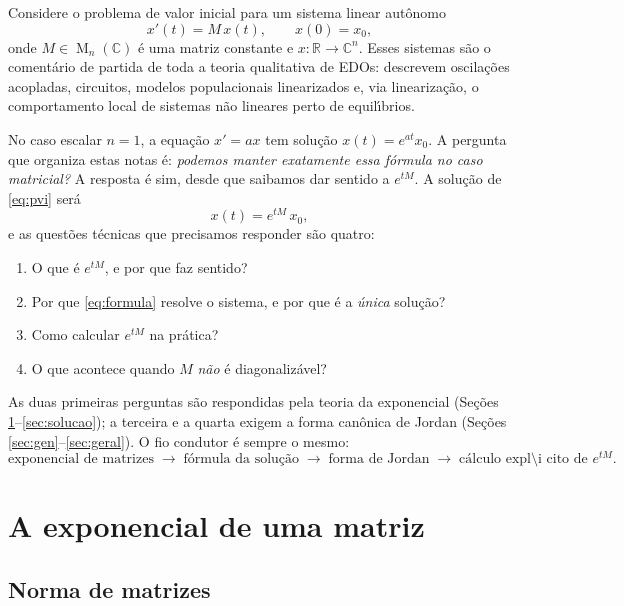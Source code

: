 \documentclass[11pt,a4paper]{amsart}
\newcommand{\R}{\mathbb{R}}
\newcommand{\C}{\mathbb{C}}
\DeclareMathOperator{\Mat}{M}
\theoremstyle{plain}
\theoremstyle{definition}
\theoremstyle{remark}
\begin{document}
Considere o problema de valor inicial para um sistema linear aut\^onomo
\begin{equation}\label{eq:pvi}
  x'(t) = M\,x(t), \qquad x(0) = x_0,
\end{equation}
onde $M\in\Mat_n(\C)$ \'e uma matriz constante e $x\colon\R\to\C^n$. Esses
sistemas s\~ao o coment\'ario de partida de toda a teoria qualitativa de EDOs:
descrevem oscila\c{c}\~oes acopladas, circuitos, modelos populacionais
linearizados e, via lineariza\c{c}\~ao, o comportamento local de sistemas n\~ao
lineares perto de equil\'\i brios.

No caso escalar $n=1$, a equa\c{c}\~ao $x'=ax$ tem solu\c{c}\~ao
$x(t)=e^{at}x_0$. A pergunta que organiza estas notas \'e: \emph{podemos manter
exatamente essa f\'ormula no caso matricial?} A resposta \'e sim, desde que
saibamos dar sentido a $e^{tM}$. A solu\c{c}\~ao de \eqref{eq:pvi} ser\'a
\begin{equation}\label{eq:formula}
  x(t) = e^{tM}\,x_0,
\end{equation}
e as quest\~oes t\'ecnicas que precisamos responder s\~ao quatro:
\begin{enumerate}[label=(\arabic*)]
  \item O que \'e $e^{tM}$, e por que faz sentido?
  \item Por que \eqref{eq:formula} resolve o sistema, e por que \'e a
        \emph{\'unica} solu\c{c}\~ao?
  \item Como calcular $e^{tM}$ na pr\'atica?
  \item O que acontece quando $M$ \emph{n\~ao} \'e diagonaliz\'avel?
\end{enumerate}
As duas primeiras perguntas s\~ao respondidas pela teoria da exponencial
(Se\c{c}\~oes \ref{sec:exp}--\ref{sec:solucao}); a terceira e a quarta exigem
a forma can\^onica de Jordan (Se\c{c}\~oes
\ref{sec:gen}--\ref{sec:geral}). O fio condutor \'e sempre o mesmo:
\[
  \text{exponencial de matrizes}
  \;\to\;
  \text{f\'ormula da solu\c{c}\~ao}
  \;\to\;
  \text{forma de Jordan}
  \;\to\;
  \text{c\'alculo expl\'\i cito de }e^{tM}.
\]

\section{A exponencial de uma matriz}
\label{sec:exp}

\subsection{Norma de matrizes}
\end{document}
